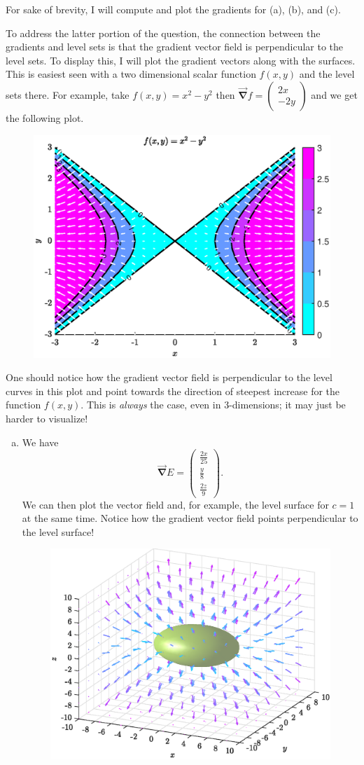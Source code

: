 \documentclass[12pt]{article} %
\newcommand{\grad}{\boldsymbol{\vec{\nabla}}}
\begin{document}
\begin{solution}
For sake of brevity, I will compute and plot the gradients for (a), (b), and (c). 

To address the latter portion of the question, the connection between the gradients and level sets is that the gradient vector field is perpendicular to the level sets. To display this, I will plot the gradient vectors along with the surfaces. This is easiest seen with a two dimensional scalar function $f(x,y)$ and the level sets there. For example, take $f(x,y)=x^2-y^2$ then $\grad f = \begin{pmatrix} 2x \\ -2y \end{pmatrix}$ and we get the following plot.
\begin{figure}[H]
    \centering
    \includegraphics[width=.65\textwidth]{figures/1}
\end{figure}
One should notice how the gradient vector field is perpendicular to the level curves in this plot and point towards the direction of steepest increase for the function $f(x,y)$. This is \emph{always} the case, even in 3-dimensions; it may just be harder to visualize!
\begin{enumerate}[(a)]
    \item We have
    \[
    \grad E = \begin{pmatrix} \frac{2x}{25} \\ \frac{y}{8} \\ \frac{2z}{9} \end{pmatrix}.
    \]
    We can then plot the vector field and, for example, the level surface for $c=1$ at the same time. Notice how the gradient vector field points perpendicular to the level surface!
    \begin{figure}[H]
        \centering
        \includegraphics[width=.65\textwidth]{figures/1a}

\end{figure}
\end{enumerate}
\end{solution}
\end{document}
